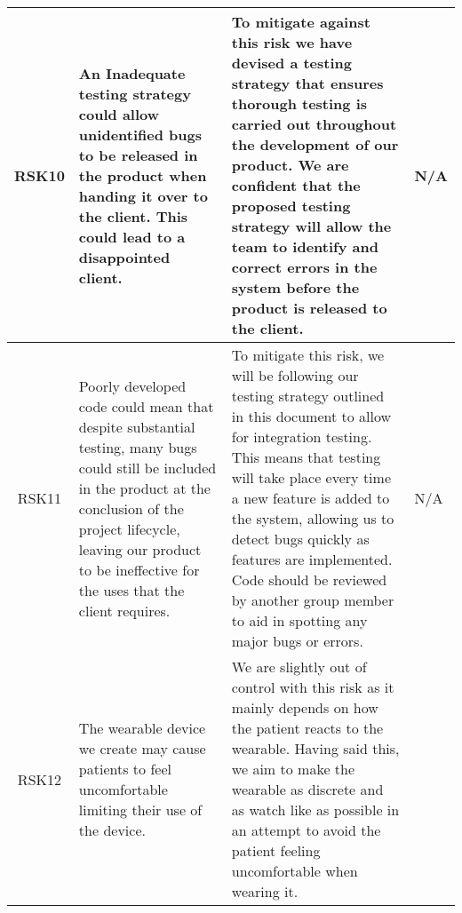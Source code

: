 \begin{xltabular}[H]{1.5\textwidth}{c | X | X | X}
    \midrule

    RSK10

    &

    An Inadequate testing strategy could allow unidentified bugs to be released in the product when handing it over to the client. This could lead to a disappointed client.

    &

    To mitigate against this risk we have devised a testing strategy that ensures thorough testing is carried out throughout the development of our product. We are confident that the proposed testing strategy will allow the team to identify and correct errors in the system before the product is released to the client.
    
    &
    
    N/A\\

    \midrule

    RSK11

    &

    Poorly developed code could mean that despite substantial testing, many bugs could still be included in the product at the conclusion of the project lifecycle, leaving our product to be ineffective for the uses that the client requires.

    &

    To mitigate this risk, we will be following our testing strategy outlined in this document to allow for integration testing. This means that testing will take place every time a new feature is added to the system, allowing us to detect bugs quickly as features are implemented. Code should be reviewed by another group member to aid in spotting any major bugs or errors.
    
    &
    
    N/A\\

    \midrule

    RSK12

    &

    The wearable device we create may cause patients to feel uncomfortable limiting their use of the device.

    &

    We are slightly out of control with this risk as it mainly depends on how the patient reacts to the wearable. Having said this, we aim to make the wearable as discrete and as watch like as possible in an attempt to avoid the patient feeling uncomfortable when wearing it.
    

\end{xltabular}
